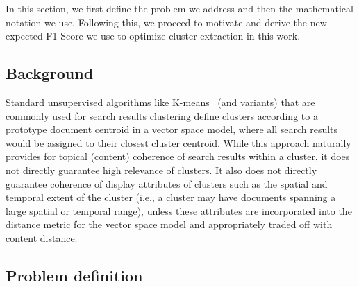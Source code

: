 In this section, we first define the problem we address and  then the mathematical notation we use.  Following this, we proceed to motivate and derive the new expected F1-Score we use to optimize cluster extraction in this work.



\subsection{Background}

Standard unsupervised algorithms like K-means~\cite{kmeans_original} (and variants) that are commonly used for search results clustering define clusters according to a prototype document centroid in a vector space model, where all search results would be assigned to their closest cluster centroid.  While this approach naturally provides for topical (content) coherence of search results within a cluster, it does not directly guarantee high relevance of clusters.  It also does not directly guarantee coherence of display attributes of clusters such as the spatial and temporal extent of the cluster (i.e., a cluster may have documents spanning a large spatial or temporal range), unless these attributes are incorporated into the distance metric for the vector space model and appropriately traded off with content distance. 

\subsection{Problem definition}

